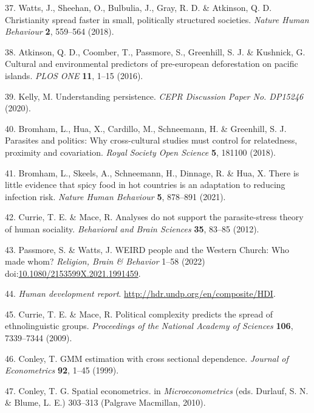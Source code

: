 \documentclass[english,man,floatsintext]{apa6}
\begin{document}
\leavevmode\hypertarget{ref-Watts2018}{}%
37. Watts, J., Sheehan, O., Bulbulia, J., Gray, R. D. \& Atkinson, Q. D. Christianity spread faster in small, politically structured societies. \emph{Nature Human Behaviour} \textbf{2}, 559--564 (2018).

\leavevmode\hypertarget{ref-Atkinson2016}{}%
38. Atkinson, Q. D., Coomber, T., Passmore, S., Greenhill, S. J. \& Kushnick, G. Cultural and environmental predictors of pre-european deforestation on pacific islands. \emph{PLOS ONE} \textbf{11}, 1--15 (2016).

\leavevmode\hypertarget{ref-Kelly2020}{}%
39. Kelly, M. Understanding persistence. \emph{CEPR Discussion Paper No. DP15246} (2020).

\leavevmode\hypertarget{ref-Bromham2018}{}%
40. Bromham, L., Hua, X., Cardillo, M., Schneemann, H. \& Greenhill, S. J. Parasites and politics: Why cross-cultural studies must control for relatedness, proximity and covariation. \emph{Royal Society Open Science} \textbf{5}, 181100 (2018).

\leavevmode\hypertarget{ref-Bromham2021}{}%
41. Bromham, L., Skeels, A., Schneemann, H., Dinnage, R. \& Hua, X. There is little evidence that spicy food in hot countries is an adaptation to reducing infection risk. \emph{Nature Human Behaviour} \textbf{5}, 878--891 (2021).

\leavevmode\hypertarget{ref-Currie2012}{}%
42. Currie, T. E. \& Mace, R. Analyses do not support the parasite-stress theory of human sociality. \emph{Behavioral and Brain Sciences} \textbf{35}, 83--85 (2012).

\leavevmode\hypertarget{ref-Passmore2022}{}%
43. Passmore, S. \& Watts, J. WEIRD people and the Western Church: Who made whom? \emph{Religion, Brain \& Behavior} 1--58 (2022) doi:\href{https://doi.org/10.1080/2153599X.2021.1991459}{10.1080/2153599X.2021.1991459}.

\leavevmode\hypertarget{ref-hdi}{}%
44. \emph{Human development report}. \url{http://hdr.undp.org/en/composite/HDI}.

\leavevmode\hypertarget{ref-Currie2009}{}%
45. Currie, T. E. \& Mace, R. Political complexity predicts the spread of ethnolinguistic groups. \emph{Proceedings of the National Academy of Sciences} \textbf{106}, 7339--7344 (2009).

\leavevmode\hypertarget{ref-Conley1999}{}%
46. Conley, T. GMM estimation with cross sectional dependence. \emph{Journal of Econometrics} \textbf{92}, 1--45 (1999).

\leavevmode\hypertarget{ref-Conley2010}{}%
47. Conley, T. G. Spatial econometrics. in \emph{Microeconometrics} (eds. Durlauf, S. N. \& Blume, L. E.) 303--313 (Palgrave Macmillan, 2010).
\end{document}
